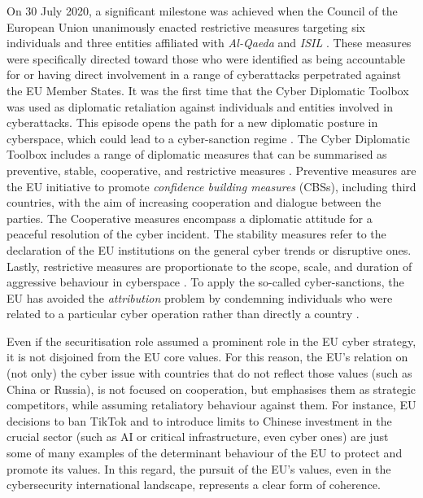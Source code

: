 On 30 July 2020, a significant milestone was achieved when the Council of the European Union unanimously enacted restrictive measures targeting six individuals and three entities affiliated with \textit{Al-Qaeda} and \textit{ISIL} \autocite{counciloftheeuropeanunion_2020_regulation}. These measures were specifically directed toward those who were identified as being accountable for or having direct involvement in a range of cyberattacks perpetrated against the EU Member States. It was the first time that the Cyber Diplomatic Toolbox was used as diplomatic retaliation against individuals and entities involved in cyberattacks. This episode opens the path for a new diplomatic posture in cyberspace, which could lead to a cyber-sanction regime \autocite{moret_2017_the}. The Cyber Diplomatic Toolbox includes a range of diplomatic measures that can be summarised as preventive, stable, cooperative, and restrictive measures \parencite{miadzvetskaya_2021_the, counciloftheeuropeanunion_2017_council}. Preventive measures are the EU initiative to promote \textit{ confidence building measures} (CBSs), including third countries, with the aim of increasing cooperation and dialogue between the parties. The Cooperative measures encompass a diplomatic attitude for a peaceful resolution of the cyber incident. The stability measures refer to the declaration of the EU institutions on the general cyber trends or disruptive ones. Lastly, restrictive measures are proportionate to the scope, scale, and duration of aggressive behaviour in cyberspace \autocite{counciloftheeuropeanunion_2017_council}. To apply the so-called cyber-sanctions, the EU has avoided the \textit{attribution} problem by condemning individuals who were related to a particular cyber operation rather than directly a country \parencite{miadzvetskaya_2021_the, bendiek_2018_the}. 

Even if the securitisation role assumed a prominent role in the EU cyber strategy, it is not disjoined from the EU core values. For this reason, the EU’s relation on (not only) the cyber issue with countries that do not reflect those values (such as China or Russia), is not focused on cooperation, but emphasises them as strategic competitors, while assuming retaliatory behaviour against them. For instance, EU decisions to ban TikTok and to introduce limits to Chinese investment in the crucial sector (such as AI or critical infrastructure, even cyber ones) are just some of many examples of the determinant behaviour of the EU to protect and promote its values. In this regard, the pursuit of the EU’s values, even in the cybersecurity international landscape, represents a clear form of coherence. 

